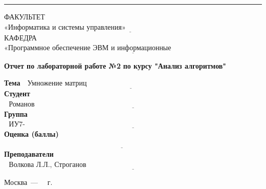 \documentclass{bmstu}
\begin{document}
\begin{titlepage}
        \noindent\rule{18cm}{3pt}
        \newline\newline
        \noindent ФАКУЛЬТЕТ $\underline{\text{«Информатика и системы управления»~~~~~~~~~~~~~~~~~~~~~~~~~~~~~~~~~~~~~~~~~~~~~~~~~~~~~~~}}$ \newline\newline
        \noindent КАФЕДРА $\underline{\text{«Программное обеспечение ЭВМ и информационные технологии»~~~~~~~~~~~~~~~~~~~~~~~}}$\newline\newline\newline\newline\newline\newline\newline


        \begin{center}
            \Large\textbf{Отчет по лабораторной работе №2}
            \Large\textbf{по курсу "Анализ алгоритмов"}
        \end{center}

        \noindent\textbf{Тема} $\underline{\text{~~Умножение матриц~~~~~~~~~~~~~~~~~~~~~~~~~~~~~~~~~~~~~~~~~~~~~~~~~~~~~~~~~~~~~~~~}}$\newline\newline\newline
        \noindent\textbf{Студент} $\underline{\text{~~Романов С.К.~~~~~~~~~~~~~~~~~~~~~~~~~~~~~~~~~~~~~~~~~~~~~~~~~~~~~~~~~~~~~~~~~~~~~~~~~~~~~~~~~~~~~~~~~}}$\newline\newline
        \noindent\textbf{Группа} $\underline{\text{~~ИУ7-55Б~~~~~~~~~~~~~~~~~~~~~~~~~~~~~~~~~~~~~~~~~~~~~~~~~~~~~~~~~~~~~~~~~~~~~~~~~~~~~~~~~~~~~~~~~~~~~~~~~}}$\newline\newline
        \noindent\textbf{Оценка (баллы)} $\underline{\text{~~~~~~~~~~~~~~~~~~~~~~~~~~~~~~~~~~~~~~~~~~~~~~~~~~~~~~~~~~~~~~~~~~~~~~~~~~~~~~~~~~~~~~~~~~~~~~~~~~~}}$\newline\newline
        \noindent\textbf{Преподаватели} $\underline{\text{~~Волкова Л.Л., Строганов Ю.В.~~~~~~~~~~~~~~~~~~~~~~~~~~~~~~~~~~~~~~~~~~~~~~~~~~~~~~~~~~~~~~~~~~~~~~~~~~~~~~}}$\newline

        \begin{center}
            \vfill
            Москва~---~\the\year
            ~г.
        \end{center}
        \restoregeometry
    \end{titlepage}

\tableofcontents







%

%

\makebibliography
\end{document}
